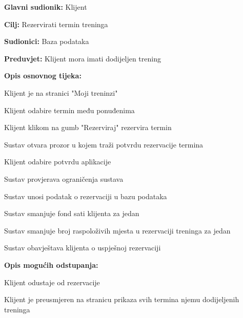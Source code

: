    					\noindent {}
					\begin{packed_item}
	
						\item \textbf{Glavni sudionik: } Klijent
						\item  \textbf{Cilj:} Rezervirati termin treninga
						\item  \textbf{Sudionici:} Baza podataka
						\item  \textbf{Preduvjet:} Klijent mora imati dodijeljen trening
						\item  \textbf{Opis osnovnog tijeka:}
						
						\item[] \begin{packed_enum}
							\item Klijent je na stranici "Moji treninzi"      
							\item Klijent odabire termin među ponuđenima
							\item Klijent klikom na gumb "Rezerviraj" rezervira termin
							\item Sustav otvara prozor u kojem traži potvrdu rezervacije termina
							\item Klijent odabire potvrdu aplikacije
							\item Sustav provjerava ograničenja sustava
							\item Sustav unosi podatak o rezervaciji u bazu podataka
							\item Sustav smanjuje fond sati klijenta za jedan
							\item Sustav smanjuje broj raspoloživih mjesta u rezervaciji treninga za jedan
							\item Sustav obavještava klijenta o uspješnoj rezervaciji
							
							
						\end{packed_enum}
						
						\item  \textbf{Opis mogućih odstupanja:}
						
						\item[] \begin{packed_item}

							\item[5.a] Klijent odustaje od rezervacije
							\item[] \begin{packed_enum}
								
								\item Klijent je preusmjeren na stranicu prikaza svih termina njemu dodijeljenih treninga
								

\end{packed_enum}
\end{packed_item}
\end{packed_item}
